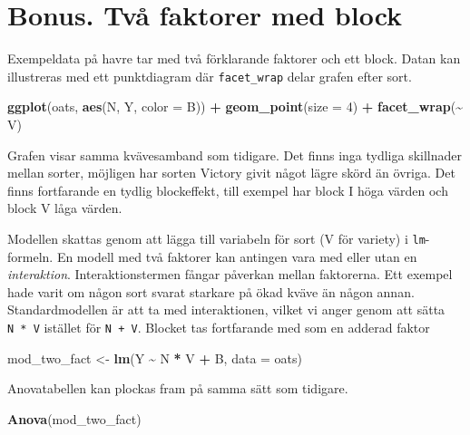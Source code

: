 \documentclass[
]{book}
\newenvironment{Shaded}{\begin{snugshade}}{\end{snugshade}}
\newcommand{\AttributeTok}[1]{\textcolor[rgb]{0.13,0.29,0.53}{#1}}
\newcommand{\DecValTok}[1]{\textcolor[rgb]{0.00,0.00,0.81}{#1}}
\newcommand{\FunctionTok}[1]{\textcolor[rgb]{0.13,0.29,0.53}{\textbf{#1}}}
\newcommand{\NormalTok}[1]{#1}
\newcommand{\OtherTok}[1]{\textcolor[rgb]{0.56,0.35,0.01}{#1}}
\newcommand{\SpecialCharTok}[1]{\textcolor[rgb]{0.81,0.36,0.00}{\textbf{#1}}}
\theoremstyle{definition}
\theoremstyle{definition}
\theoremstyle{definition}
\theoremstyle{definition}
\theoremstyle{remark}
\begin{document}
\section{Bonus. Två faktorer med block}\label{bonus.-tvuxe5-faktorer-med-block}

Exempeldata på havre tar med två förklarande faktorer och ett block. Datan kan illustreras med ett punktdiagram där \texttt{facet\_wrap} delar grafen efter sort.

\begin{Shaded}
\begin{Highlighting}[]
\FunctionTok{ggplot}\NormalTok{(oats, }\FunctionTok{aes}\NormalTok{(N, Y, }\AttributeTok{color =}\NormalTok{ B)) }\SpecialCharTok{+}
  \FunctionTok{geom\_point}\NormalTok{(}\AttributeTok{size =} \DecValTok{4}\NormalTok{) }\SpecialCharTok{+}
  \FunctionTok{facet\_wrap}\NormalTok{(}\SpecialCharTok{\textasciitilde{}}\NormalTok{ V)}
\end{Highlighting}
\end{Shaded}

Grafen visar samma kvävesamband som tidigare. Det finns inga tydliga skillnader mellan sorter, möjligen har sorten Victory givit något lägre skörd än övriga. Det finns fortfarande en tydlig blockeffekt, till exempel har block I höga värden och block V låga värden.

Modellen skattas genom att lägga till variabeln för sort (V för variety) i \texttt{lm}-formeln. En modell med två faktorer kan antingen vara med eller utan en \emph{interaktion}. Interaktionstermen fångar påverkan mellan faktorerna. Ett exempel hade varit om någon sort svarat starkare på ökad kväve än någon annan. Standardmodellen är att ta med interaktionen, vilket vi anger genom att sätta \texttt{N\ *\ V} istället för \texttt{N\ +\ V}. Blocket tas fortfarande med som en adderad faktor

\begin{Shaded}
\begin{Highlighting}[]
\NormalTok{mod\_two\_fact }\OtherTok{\textless{}{-}} \FunctionTok{lm}\NormalTok{(Y }\SpecialCharTok{\textasciitilde{}}\NormalTok{ N }\SpecialCharTok{*}\NormalTok{ V }\SpecialCharTok{+}\NormalTok{ B, }\AttributeTok{data =}\NormalTok{ oats)}
\end{Highlighting}
\end{Shaded}

Anovatabellen kan plockas fram på samma sätt som tidigare.

\begin{Shaded}
\begin{Highlighting}[]
\FunctionTok{Anova}\NormalTok{(mod\_two\_fact)}
\end{Highlighting}
\end{Shaded}
\end{document}
